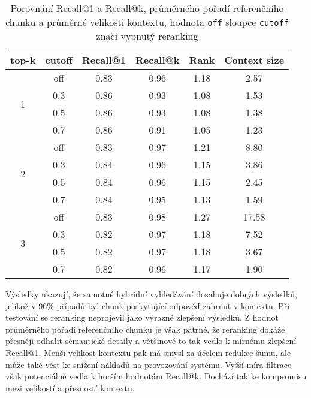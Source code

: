 \begin{table}[H]
    \centering
    \label{tab:retrieval_metrics_full}
    \renewcommand{\arraystretch}{1.2}
    \begin{tabular}{|c|c|c|c|c|c|}
        \hline
        \textbf{top-k} & \textbf{cutoff} & \textbf{Recall@1} & \textbf{Recall@k} & \textbf{Rank} & \textbf{Context size} \\
        \hline
        \multirow{4}{*}{1} 
        & off   & 0.83 & 0.96 & 1.18 & 2.57 \\
        & 0.3   & 0.86 & 0.93 & 1.08 & 1.53 \\
        & 0.5   & 0.86 & 0.93 & 1.08 & 1.38 \\
        & 0.7   & 0.86 & 0.91 & 1.05 & 1.23 \\
        \hline
        \multirow{4}{*}{2} 
        & off   & 0.83 & 0.97 & 1.21 & 8.80 \\
        & 0.3   & 0.84 & 0.96 & 1.15 & 3.86 \\
        & 0.5   & 0.84 & 0.96 & 1.15 & 2.45 \\
        & 0.7   & 0.84 & 0.95 & 1.13 & 1.59 \\
        \hline
        \multirow{4}{*}{3} 
        & off   & 0.83 & 0.98 & 1.27 & 17.58 \\
        & 0.3   & 0.82 & 0.97 & 1.18 & 7.52 \\
        & 0.5   & 0.82 & 0.97 & 1.18 & 3.67 \\
        & 0.7   & 0.82 & 0.96 & 1.17 & 1.90 \\
        \hline
    \end{tabular}
    \caption{Porovnání Recall@1 a Recall@k, průměrného pořadí referenčního chunku a průměrné velikosti kontextu, hodnota \texttt{off} sloupce \texttt{cutoff} značí vypnutý reranking}
\end{table}

Výsledky ukazují, že samotné hybridní vyhledávání dosahuje dobrých výsledků, jelikož v 96\% případů byl chunk poskytující odpověď zahrnut v kontextu. Při testování se reranking neprojevil jako výrazné zlepšení výsledků. Z hodnot průměrného pořadí referenčního chunku je však patrné, že reranking dokáže přesněji odhalit sémantické detaily a většinově to tak vedlo k mírnému zlepšení Recall@1. Menší velikost kontextu pak má smysl za účelem redukce šumu, ale může také vést ke snížení nákladů na provozování systému. Vyšší míra filtrace však potenciálně vedla k horším hodnotám Recall@k. Dochází tak ke kompromisu mezi velikostí a přesností kontextu.   

